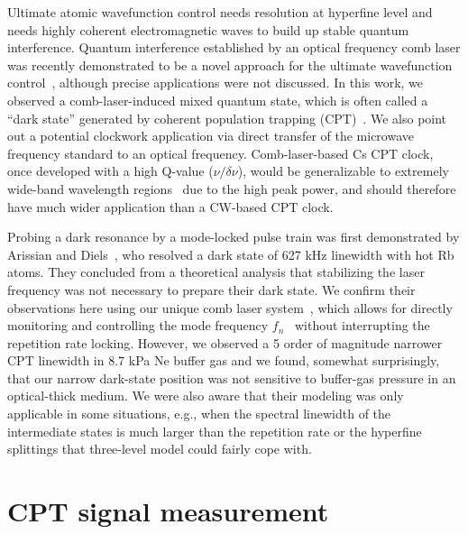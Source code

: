 \documentclass[%
aps,
prl,
showpacs,
twocolumn,
]{revtex4}
\begin{document}
Ultimate atomic wavefunction control needs resolution at hyperfine
level and needs highly coherent electromagnetic waves to build up 
stable quantum interference. Quantum interference established by an 
optical frequency comb laser was recently demonstrated to be a novel 
approach for the ultimate wavefunction control~\cite{Stowe2008}, 
although precise applications were not discussed. In this work, 
we observed a comb-laser-induced mixed quantum state, which is 
often called a ``dark state'' generated by coherent population 
trapping (CPT)~\cite{Vanier2005}. We also point out a potential clockwork 
application via direct transfer of the microwave frequency standard to an optical 
frequency. Comb-laser-based Cs CPT clock, once developed with a high 
Q-value ($\nu/\delta\nu$), would be generalizable to extremely wide-band
wavelength regions~\cite{Gohle2005, Dudley2006} due to the high peak power, and 
should therefore have much wider application than a CW-based CPT clock.
    
 Probing a dark resonance by a mode-locked pulse train was first demonstrated 
by Arissian and Diels~\cite{Arissian2006}, who resolved a dark state of 627 kHz
linewidth with hot Rb atoms. They concluded from a theoretical analysis that 
stabilizing the laser frequency was not necessary to prepare their dark state. 
We confirm their observations here using our unique comb laser 
system~\cite{Cheng2008}, which allows for directly monitoring and controlling 
the mode frequency $f_n$~\cite{Cheng2008,Cheng2007} without interrupting the 
repetition rate locking. However, we observed a 5 order of magnitude 
narrower CPT linewidth in 8.7 kPa Ne buffer gas and we found, somewhat 
surprisingly, that our narrow dark-state position was not 
sensitive to buffer-gas pressure in an optical-thick medium. We were also 
aware that their modeling was only applicable in some situations, e.g., when 
the spectral linewidth of the intermediate states is much larger than the 
repetition rate or the hyperfine splittings that three-level model could fairly 
cope with. 

\section{CPT signal measurement}
\end{document}
